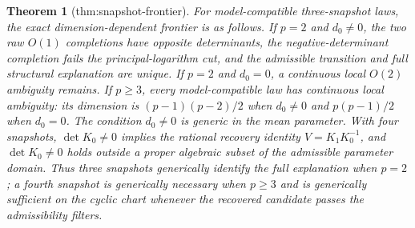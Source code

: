 \documentclass{article}
\newtheorem{theorem}{Theorem}
\begin{document}
\begin{theorem}[thm:snapshot-frontier]\label{thm:snapshot-frontier}
For model-compatible three-snapshot laws, the exact dimension-dependent frontier is as follows.  If \(p=2\) and \(d_0\ne0\), the two raw \(O(1)\) completions have opposite determinants, the negative-determinant completion fails the principal-logarithm cut, and the admissible transition and full structural explanation are unique.  If \(p=2\) and \(d_0=0\), a continuous local \(O(2)\) ambiguity remains.  If \(p\ge3\), every model-compatible law has continuous local ambiguity: its dimension is \((p-1)(p-2)/2\) when \(d_0\ne0\) and \(p(p-1)/2\) when \(d_0=0\).  The condition \(d_0\ne0\) is generic in the mean parameter.  With four snapshots, \(\det K_0\ne0\) implies the rational recovery identity \(V=K_1K_0^{-1}\), and \(\det K_0\ne0\) holds outside a proper algebraic subset of the admissible parameter domain.  Thus three snapshots generically identify the full explanation when \(p=2\); a fourth snapshot is generically necessary when \(p\ge3\) and is generically sufficient on the cyclic chart whenever the recovered candidate passes the admissibility filters.
\end{theorem}
\end{document}
